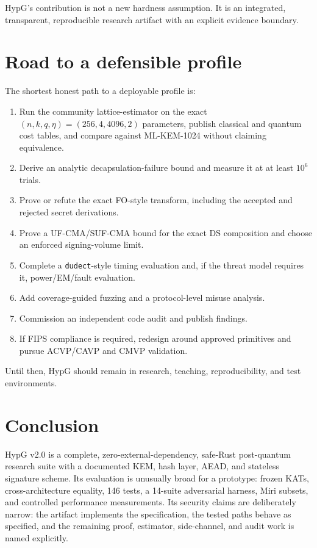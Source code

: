 \documentclass[11pt,a4paper]{article}
\theoremstyle{plain}
\theoremstyle{definition}
\theoremstyle{remark}
\begin{document}
HypG's contribution is not a new hardness assumption.  It is an
integrated, transparent, reproducible research artifact with an
explicit evidence boundary.

\section{Road to a defensible profile}
\label{sec:roadmap}

The shortest honest path to a deployable profile is:

\begin{enumerate}[leftmargin=*]
\item Run the community lattice-estimator on the exact
  $(n,k,q,\eta)=(256,4,4096,2)$ parameters, publish classical and
  quantum cost tables, and compare against ML-KEM-1024 without claiming
  equivalence.
\item Derive an analytic decapsulation-failure bound and measure it at
  at least $10^6$ trials.
\item Prove or refute the exact FO-style transform, including the
  accepted and rejected secret derivations.
\item Prove a UF-CMA/SUF-CMA bound for the exact DS composition and
  choose an enforced signing-volume limit.
\item Complete a \texttt{dudect}-style timing evaluation and, if the
  threat model requires it, power/EM/fault evaluation.
\item Add coverage-guided fuzzing and a protocol-level misuse analysis.
\item Commission an independent code audit and publish findings.
\item If FIPS compliance is required, redesign around approved
  primitives and pursue ACVP/CAVP and CMVP validation.
\end{enumerate}

Until then, HypG should remain in research, teaching, reproducibility,
and test environments.

\section{Conclusion}
\label{sec:conclusion}

HypG v2.0 is a complete, zero-external-dependency, safe-Rust
post-quantum research suite with a documented KEM, hash layer, AEAD, and
stateless signature scheme.  Its evaluation is unusually broad for a
prototype: frozen KATs, cross-architecture equality, 146 tests, a
14-suite adversarial harness, Miri subsets, and controlled performance
measurements.  Its security claims are deliberately narrow: the
artifact implements the specification, the tested paths behave as
specified, and the remaining proof, estimator, side-channel, and audit
work is named explicitly.
\end{document}
